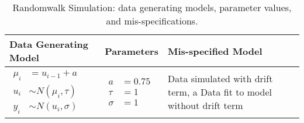 \begin{table}[h]
    \caption{Randomwalk Simulation: data generating models, parameter values, and mis-specifications.}
    \begin{tabular}{llp{8cm}}
    \hline
    Data Generating Model & Parameters & Mis-specified Model \\
    \hline
    {$\!\begin{aligned}
     \mu_{i} &= u_{i-1} + a \\
    u_{i} &\sim N(\mu_{i},\tau) \\
    y_{i} &\sim N(u_{i}, \sigma)
    \end{aligned}$}
    &
    {$\!\begin{aligned}
    a &= 0.75 \\
    \tau &= 1 \\
    \sigma &= 1
    \end{aligned}$}
    &
    Data simulated with drift term, a \newline
    Data fit to model without drift term\\
    \hline
    \end{tabular}
    \end{table}
